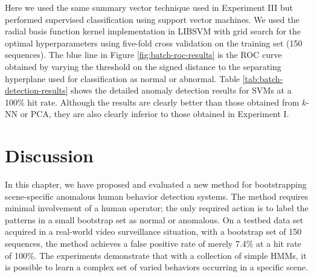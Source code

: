 Here we used the same summary vector technique used in Experiment III
but performed supervised classification using support vector
machines. We used the radial basis function kernel implementation in
LIBSVM  with grid search for the optimal
hyperparameters using five-fold cross validation on the training set
(150 sequences). The blue line in Figure \ref{fig:batch-roc-results}
is the ROC curve obtained by varying the threshold on the signed
distance to the separating hyperplane used for classification as
normal or abnormal.  Table \ref{tab:batch-detection-results} shows the
detailed anomaly detection results for SVMs at a 100\% hit rate.
Although the results are clearly better than those obtained from
$k$-NN or PCA, they are also clearly inferior to those obtained in
Experiment I.


\section{Discussion}
\label{sec:batch-discussion}

In this chapter, we have proposed and evaluated a new method for
bootstrapping scene-specific anomalous human behavior detection
systems.  The method requires minimal involvement of a human operator;
the only required action is to label the patterns in a small bootstrap
set as normal or anomalous.  On a testbed data set acquired in a
real-world video surveillance situation, with a bootstrap set of 150
sequences, the method achieves a false positive rate of merely 7.4\%
at a hit rate of 100\%.  The experiments demonstrate that with a
collection of simple HMMs, it is possible to learn a complex set of
varied behaviors occurring in a specific scene.

\FloatBarrier

